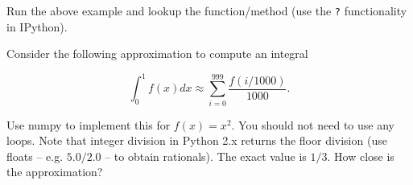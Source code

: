 \begin{exercise}
Run the above example and lookup the  function/method (use the \texttt{?} functionality in IPython).
\end{exercise}


\begin{exercise}
Consider the following approximation to compute an integral

\[
\int_0^{1} f(x)dx \approx \sum_{i = 0}^{999} \frac{f(i/1000)}{1000}.
\]

Use numpy to implement this for $f(x) = x^2$. You should not need to use any loops. Note that integer division in Python 2.x returns the floor division (use floats -- e.g. $5.0/2.0$ -- to obtain rationals). The exact value is $1/3$. How close is the approximation?
\end{exercise}



% 
% 
% 
% 
% 
% 
% 
% 
% 
% 
% 
